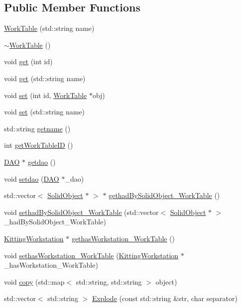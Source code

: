\subsection*{Public Member Functions}
\begin{DoxyCompactItemize}
\item 
\hyperlink{class_work_table_ad9c2cfbb881924fd2b3483036e3624af}{WorkTable} (std::string name)
\item 
\hyperlink{class_work_table_aa61cbe21ecd0ec6f4f0db7c9d6c12d8e}{$\sim$WorkTable} ()
\item 
void \hyperlink{class_work_table_af112dcf025d58e18177337ae701f7af4}{get} (int id)
\item 
void \hyperlink{class_work_table_a72e440916d93fddc774eb1e941564d0f}{get} (std::string name)
\item 
void \hyperlink{class_work_table_ac609ee79a7e237cd90ee6692979371ae}{set} (int id, \hyperlink{class_work_table}{WorkTable} $\ast$obj)
\item 
void \hyperlink{class_work_table_a66d9882cfeab54526a9c0d8ec9308e7c}{set} (std::string name)
\item 
std::string \hyperlink{class_work_table_ad00c3838d6e330f3f939fbbe48183eef}{getname} ()
\item 
int \hyperlink{class_work_table_ae56d62c8931b310c25f84638467f05c9}{getWorkTableID} ()
\item 
\hyperlink{class_d_a_o}{DAO} $\ast$ \hyperlink{class_work_table_a5d9f68112bb3c03985abc6fd036caac6}{getdao} ()
\item 
void \hyperlink{class_work_table_a715bb8e356f05a8fd25483a2dc2fc082}{setdao} (\hyperlink{class_d_a_o}{DAO} $\ast$\_\-dao)
\item 
std::vector$<$ \hyperlink{class_solid_object}{SolidObject} $\ast$ $>$ $\ast$ \hyperlink{class_work_table_a4d990d5d21fb275f11d55b0c03e753e2}{gethadBySolidObject\_\-WorkTable} ()
\item 
void \hyperlink{class_work_table_accfc96db32a72af7c6d492f8ff18ec28}{sethadBySolidObject\_\-WorkTable} (std::vector$<$ \hyperlink{class_solid_object}{SolidObject} $\ast$ $>$ \_\-hadBySolidObject\_\-WorkTable)
\item 
\hyperlink{class_kitting_workstation}{KittingWorkstation} $\ast$ \hyperlink{class_work_table_a47417a460bcf0e637ba6fcfc098d97c0}{gethasWorkstation\_\-WorkTable} ()
\item 
void \hyperlink{class_work_table_a398439260cc31d18c81b101defc0f6d2}{sethasWorkstation\_\-WorkTable} (\hyperlink{class_kitting_workstation}{KittingWorkstation} $\ast$\_\-hasWorkstation\_\-WorkTable)
\item 
void \hyperlink{class_work_table_a1096cf39ac0cfb98f27b8157f2eeacb7}{copy} (std::map$<$ std::string, std::string $>$ object)
\item 
std::vector$<$ std::string $>$ \hyperlink{class_work_table_a5bb5cd3ba5cf2095de6b4aa22db33f7e}{Explode} (const std::string \&str, char separator)
\end{DoxyCompactItemize}


